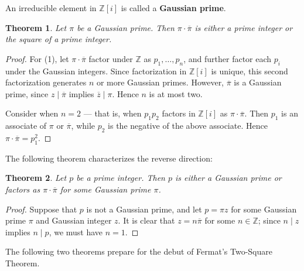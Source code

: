 \documentclass[11pt]{article}
\newtheorem{theorem}{Theorem}
\newcommand{\conjugate}[1]{\overline{#1}}
\begin{document}
An irreducible element in $\mathbb{Z}[i]$ is called a \textbf{Gaussian prime}.

\begin{adjustwidth}{0.5cm}{}
  \begin{theorem}
    Let $\pi$ be a Gaussian prime. Then $\pi \cdot \conjugate{\pi}$ is either a prime integer or the square of a prime integer.
  \end{theorem}
  \begin{proof}
    For (1), let $\pi \cdot \conjugate{\pi}$ factor under $\mathbb{Z}$ as $p_{1}, \ldots, p_{n}$, and further factor each $p_{i}$ under the Gaussian integers. Since factorization in $\mathbb{Z}[i]$ is unique, this second factorization generates $n$ or more Gaussian primes. However, $\conjugate{\pi}$ is a Gaussian prime, since $z \mid \conjugate{\pi}$ implies $\conjugate{z} \mid \pi$. Hence $n$ is at most two.

    Consider when $n = 2$ --- that is, when $p_{1}p_{2}$ factors in $\mathbb{Z}[i]$ as $\pi \cdot \conjugate{\pi}$. Then $p_{1}$ is an associate of $\pi$ or $\conjugate{\pi}$, while $p_{2}$ is the negative of the above associate. Hence $\pi \cdot \conjugate{\pi} = p_{1}^{2}$.
  \end{proof}
\end{adjustwidth}

The following theorem characterizes the reverse direction:

\begin{adjustwidth}{0.5cm}{}
  \begin{theorem}
    Let $p$ be a prime integer. Then $p$ is either a Gaussian prime or factors as $\pi \cdot \conjugate{\pi}$ for some Gaussian prime $\pi$.
  \end{theorem}
  \begin{proof}
    Suppose that $p$ is not a Gaussian prime, and let $p = \pi z$ for some Gaussian prime $\pi$ and Gaussian integer $z$. It is clear that $z = n \conjugate{\pi}$ for some $n \in \mathbb{Z}$; since $n \mid z$ implies $n \mid p$, we must have $n = 1$.
  \end{proof}
\end{adjustwidth}

The following two theorems prepare for the debut of Fermat's Two-Square Theorem.
\end{document}
